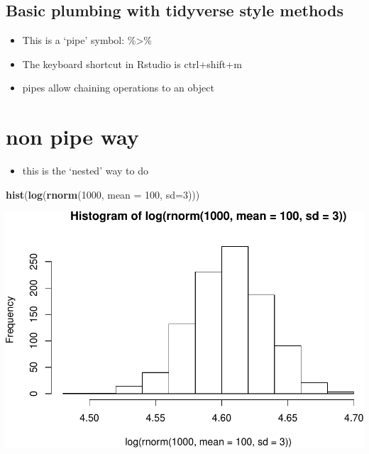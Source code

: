 \documentclass[]{article}
\newenvironment{Shaded}{\begin{snugshade}}{\end{snugshade}}
\newcommand{\DataTypeTok}[1]{\textcolor[rgb]{0.13,0.29,0.53}{#1}}
\newcommand{\DecValTok}[1]{\textcolor[rgb]{0.00,0.00,0.81}{#1}}
\newcommand{\KeywordTok}[1]{\textcolor[rgb]{0.13,0.29,0.53}{\textbf{#1}}}
\newcommand{\NormalTok}[1]{#1}
\providecommand{\tightlist}{%
  \setlength{\itemsep}{0pt}\setlength{\parskip}{0pt}}
\begin{document}
\hypertarget{basic-plumbing-with-tidyverse-style-methods}{%
\subsection{Basic plumbing with tidyverse style
methods}\label{basic-plumbing-with-tidyverse-style-methods}}

\begin{itemize}
\tightlist
\item
  This is a `pipe' symbol: \%\textgreater{}\%
\item
  The keyboard shortcut in Rstudio is ctrl+shift+m
\item
  pipes allow chaining operations to an object
\end{itemize}

\hypertarget{non-pipe-way}{%
\section{non pipe way}\label{non-pipe-way}}

\begin{itemize}
\tightlist
\item
  this is the `nested' way to do
\end{itemize}

\begin{Shaded}
\begin{Highlighting}[]
\KeywordTok{hist}\NormalTok{(}\KeywordTok{log}\NormalTok{(}\KeywordTok{rnorm}\NormalTok{(}\DecValTok{1000}\NormalTok{, }\DataTypeTok{mean =} \DecValTok{100}\NormalTok{, }\DataTypeTok{sd=}\DecValTok{3}\NormalTok{)))}
\end{Highlighting}
\end{Shaded}

\includegraphics{R_tidyverse_for_geographers_files/figure-latex/unnamed-chunk-2-1.pdf}
\end{document}
